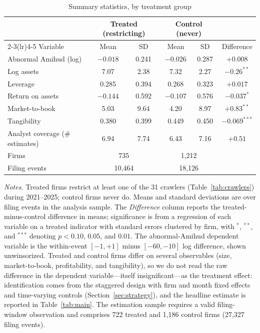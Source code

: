 \begin{table}[t]
\centering
\begin{threeparttable}
\caption{Summary statistics, by treatment group}
\label{tab:summ}
\small
\begin{tabular}{lccccc}
\toprule
 & \multicolumn{2}{c}{Treated (restricting)} & \multicolumn{2}{c}{Control (never)} & \\
\cmidrule(lr){2-3}\cmidrule(lr){4-5}
Variable & Mean & SD & Mean & SD & Difference \\
\midrule
Abnormal Amihud (log)              & $-0.018$ & 0.241 & $-0.026$ & 0.287 & $+0.008$ \\
Log assets                          & 7.07     & 2.38  & 7.32     & 2.27  & $-0.26^{**}$ \\
Leverage                            & 0.285    & 0.394 & 0.268    & 0.323 & $+0.017$ \\
Return on assets                    & $-0.144$ & 0.592 & $-0.107$ & 0.576 & $-0.037^{*}$ \\
Market-to-book                      & 5.03     & 9.64  & 4.20     & 8.97  & $+0.83^{**}$ \\
Tangibility                         & 0.380    & 0.399 & 0.449    & 0.450 & $-0.069^{***}$ \\
Analyst coverage (\# estimates)     & 6.94     & 7.74  & 6.43     & 7.16  & $+0.51$ \\
\midrule
Firms                               & \multicolumn{2}{c}{735} & \multicolumn{2}{c}{1{,}212} & \\
Filing events                       & \multicolumn{2}{c}{10{,}464} & \multicolumn{2}{c}{18{,}126} & \\
\bottomrule
\end{tabular}
\begin{tablenotes}\footnotesize
\item \textit{Notes.} Treated firms restrict at least one of the 31 crawlers (Table~\ref{tab:crawlers}) during 2021--2025; control firms never do. Means and standard deviations are over filing events in the analysis sample. The \emph{Difference} column reports the treated-minus-control difference in means; significance is from a regression of each variable on a treated indicator with standard errors clustered by firm, with $^{*}$, $^{**}$, and $^{***}$ denoting $p<0.10$, $0.05$, and $0.01$. The abnormal-Amihud dependent variable is the within-event $[-1,+1]$ minus $[-60,-10]$ log difference, shown unwinsorized. Treated and control firms differ on several observables (size, market-to-book, profitability, and tangibility), so we do not read the raw difference in the dependent variable---itself insignificant---as the treatment effect: identification comes from the staggered design with firm and month fixed effects and time-varying controls (Section~\ref{sec:strategy}), and the headline estimate is reported in Table~\ref{tab:main}. The estimation sample requires a valid filing-window observation and comprises 722 treated and 1{,}186 control firms (27{,}327 filing events).
\end{tablenotes}
\end{threeparttable}
\end{table}
